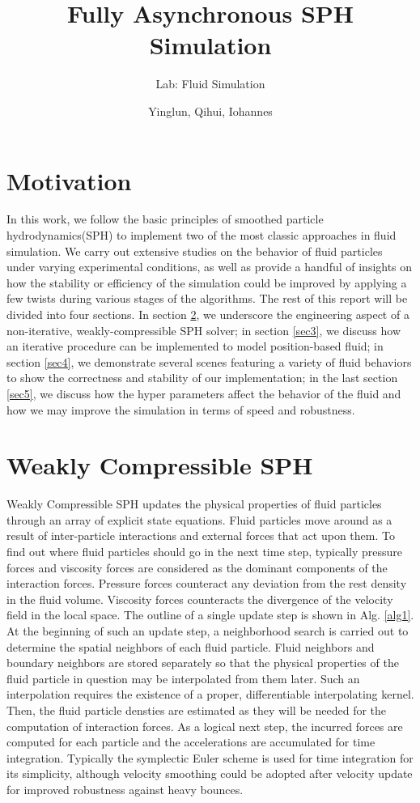 \documentclass[
	11pt, 
	DIV10,
	ngerman,
	a4paper, 
	oneside, 
	headings=normal, 
	captions=tableheading,
	final, 
	numbers=noenddot
]{scrartcl}
\title{Fully Asynchronous SPH Simulation}
\subtitle{\vspace{0.5cm}Lab: Fluid Simulation}
\author{Yinglun, Qihui, Iohannes}
\begin{document}
\maketitle


\section{Motivation}

In this work, we follow the basic principles of smoothed particle hydrodynamics(SPH) to implement two of the most classic approaches in fluid simulation. We carry out extensive studies on the behavior of fluid particles under varying experimental conditions, as well as provide a handful of insights on how the stability or efficiency of the simulation could be improved by applying a few twists during various stages of the algorithms. The rest of this report will be divided into four sections. In section \ref{sec2}, we underscore the engineering aspect of a non-iterative, weakly-compressible SPH solver; in section \ref{sec3}, we discuss how an iterative procedure can be implemented to model position-based fluid; in section \ref{sec4}, we demonstrate several scenes featuring a variety of fluid behaviors to show the correctness and stability of our implementation; in the last section \ref{sec5}, we discuss how the hyper parameters affect the behavior of the fluid and how we may improve the simulation in terms of speed and robustness.


\section{Weakly Compressible SPH}
\label{sec2}

Weakly Compressible SPH updates the physical properties of fluid particles through an array of explicit state equations. Fluid particles move around as a result of inter-particle interactions and external forces that act upon them. To find out where fluid particles should go in the next time step, typically pressure forces and viscosity forces are considered as the dominant components of the interaction forces. Pressure forces counteract any deviation from the rest density in the fluid volume. Viscosity forces counteracts the divergence of the velocity field in the local space. The outline of a single update step is shown in Alg. \ref{alg1}. At the beginning of such an update step, a neighborhood search is carried out to determine the spatial neighbors of each fluid particle. Fluid neighbors and boundary neighbors are stored separately so that the physical properties of the fluid particle in question may be interpolated from them later. Such an interpolation requires the existence of a proper, differentiable interpolating kernel. Then, the fluid particle densties are estimated as they will be needed for the computation of interaction forces. As a logical next step, the incurred forces are computed for each particle and the accelerations are accumulated for time integration. Typically the symplectic Euler scheme is used for time integration for its simplicity, although velocity smoothing could be adopted after velocity update for improved robustness against heavy bounces.
\end{document}
